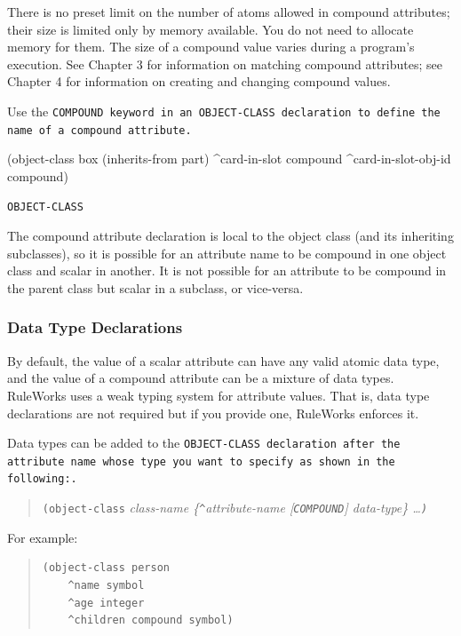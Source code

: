 There is no preset limit on the number of atoms allowed in compound
attributes; their size is limited only by memory available. You do not
need to allocate memory for them. The size of a compound value varies
during a program's execution.  See Chapter 3 for information on
matching compound attributes; see Chapter 4 for information on
creating and changing compound values.

Use the \tt{COMPOUND} keyword in an \tt{OBJECT-CLASS} declaration to
define the name of a compound attribute.

\begin{example}[h]
\begin{qv}
(object-class box
    (inherits-from part)
    ^card-in-slot compound
    ^card-in-slot-obj-id compound)
\end{qv}
\caption{\tt{OBJECT-CLASS}}
\end{example}

The compound attribute declaration is local to the object
class (and its inheriting subclasses), so it is possible for
an attribute name to be compound in one object class and
scalar in another. It is not possible for an attribute to be
compound in the parent class but scalar in a subclass, or
vice-versa.

\subsubsection*{Data Type Declarations}

By default, the value of a scalar attribute can have any
valid atomic data type, and the value of a compound attribute
can be a mixture of data types. RuleWorks uses a weak typing
system for attribute values. That is, data type declarations
are not required but if you provide one, RuleWorks enforces
it.

Data types can be added to the \tt{OBJECT-CLASS} declaration after
the attribute name whose type you want to specify as shown in
the following:.

\begin{quote}
  \verb|(object-class| \it{class-name} \{\verb|^|\it{attribute-name}
    [\verb|COMPOUND|] \it{data-type}\} \ldots \verb|)|
\end{quote}

For example:

\begin{quote}
\begin{verbatim}
(object-class person
    ^name symbol
    ^age integer
    ^children compound symbol)
\end{verbatim}
\end{quote}

